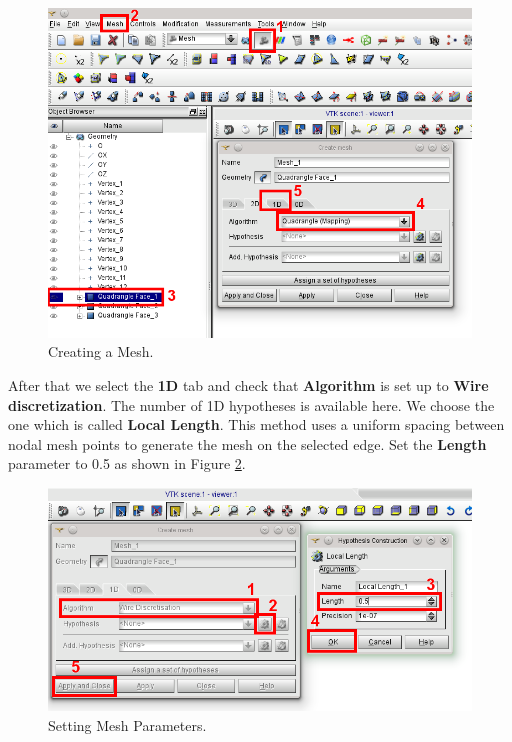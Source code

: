 \begin{figure}[tbp]
\begin{center}
\includegraphics[scale=0.50]{figures/SalomeStep3.png}
\caption{Creating a Mesh.}
\label{fig:no3.2.1.9}
\end{center}
\end{figure}

After that we select the \textbf{1D} tab and check that \textbf{Algorithm} is set up to \textbf{Wire discretization}. The number of 1D hypotheses is available here. We choose the one which is called \textbf{Local Length}. This method uses a uniform spacing between nodal mesh points to generate the mesh on the selected edge. Set the \textbf{Length} parameter to 0.5 as shown in Figure \ref{fig:no3.2.1.10}.

\begin{figure}[tbp]
\begin{center}
\includegraphics[scale=0.50]{figures/SalomeStep3b.png}
\caption{Setting Mesh Parameters.}
\label{fig:no3.2.1.10}
\end{center}
\end{figure}


